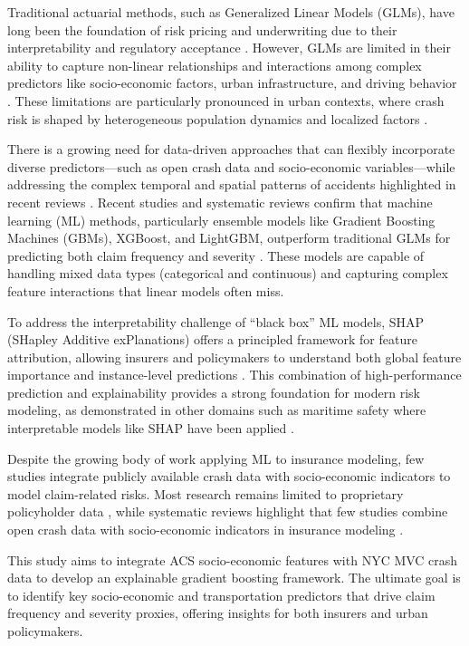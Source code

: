 \documentclass[
  number,
  review,
  3p]{elsarticle}
\begin{document}
Traditional actuarial methods, such as Generalized Linear Models (GLMs),
have long been the foundation of risk pricing and underwriting due to
their interpretability and regulatory acceptance \citep{henckaerts}.
However, GLMs are limited in their ability to capture non-linear
relationships and interactions among complex predictors like
socio-economic factors, urban infrastructure, and driving behavior
\citep{clemente}. These limitations are particularly pronounced in urban
contexts, where crash risk is shaped by heterogeneous population
dynamics and localized factors \citep[\citep{brubacher}]{cabrera}.

There is a growing need for data-driven approaches that can flexibly
incorporate diverse predictors---such as open crash data and
socio-economic variables---while addressing the complex temporal and
spatial patterns of accidents highlighted in recent reviews
\citep[\citep{behboudi}]{grigorev}. Recent studies and systematic
reviews confirm that machine learning (ML) methods, particularly
ensemble models like Gradient Boosting Machines (GBMs), XGBoost, and
LightGBM, outperform traditional GLMs for predicting both claim
frequency and severity \citep[\citep{mohamed},
\citep{behboudi}]{clemente}. These models are capable of handling mixed
data types (categorical and continuous) and capturing complex feature
interactions that linear models often miss.

To address the interpretability challenge of ``black box'' ML models,
SHAP (SHapley Additive exPlanations) offers a principled framework for
feature attribution, allowing insurers and policymakers to understand
both global feature importance and instance-level predictions
\citep[\citep{dong}, \citep{ning}]{lundberg}. This combination of
high-performance prediction and explainability provides a strong
foundation for modern risk modeling, as demonstrated in other domains
such as maritime safety where interpretable models like SHAP have been
applied \citep{kim}.

Despite the growing body of work applying ML to insurance modeling, few
studies integrate publicly available crash data with socio-economic
indicators to model claim-related risks. Most research remains limited
to proprietary policyholder data \citep[\citep{mohamed}]{henckaerts},
while systematic reviews highlight that few studies combine open crash
data with socio-economic indicators in insurance modeling
\citep[\citep{behboudi}]{ali}.

This study aims to integrate ACS socio-economic features with NYC MVC
crash data to develop an explainable gradient boosting framework. The
ultimate goal is to identify key socio-economic and transportation
predictors that drive claim frequency and severity proxies, offering
insights for both insurers and urban policymakers.
\end{document}
